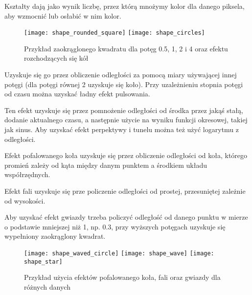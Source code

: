 
Kształty dają jako wynik liczbę, przez którą mnożymy kolor dla danego piksela, aby wzmocnić lub osłabić w nim kolor.\bigskip

\begin{wrapfigure}{l}{0.55\textwidth}
	\centering
	\noindent\texttt{[image: shape\_rounded\_square]}
	\noindent\texttt{[image: shape\_circles]}
	\caption{Przykład zaokrąglonego kwadratu dla potęg 0.5, 1, 2 i 4 oraz efektu rozchodzących się kół}
\end{wrapfigure}


Uzyskuje się go przez obliczenie odległo\'sci za pomocą miary używającej innej potęgi (dla potęgi równej 2 uzyskuje się koło). Przy uzależnieniu stopnia potęgi od czasu można uzyskać ładny efekt pulsowania.\smallskip


Ten efekt uzyskuje się przez pomnożenie odległo\'sci od \'srodka przez jaką\'s stałą, dodanie aktualnego czasu, a następnie użycie na wyniku funkcji okresowej, takiej jak sinus. Aby uzyskać efekt perpektywy i tunelu można też użyć logarytmu z odległo\'sci.\smallskip\\


Efekt pofalowanego koła uzyskuje się przez obliczenie odległo\'sci od koła, którego promień zależy od kąta między danym punktem a \'srodkiem układu współrzędnych.\smallskip


Efekt fali uzyskuje się prze policzenie odległo\'sci od prostej, przesuniętej zależnie od wysoko\'sci.\smallskip


Aby uzyskać efekt gwiazdy trzeba policzyć odległo\'sć od danego punktu w mierze o podstawie mniejszej niż 1, np. 0.3, przy wyższych potęgach uzyskuje się wypełniony zaokrąglony kwadrat.

\begin{figure}[h]
	\centering
	\noindent\texttt{[image: shape\_waved\_circle]}
	\noindent\texttt{[image: shape\_wave]}
	\noindent\texttt{[image: shape\_star]}
	\caption{Przykład użycia efektów pofalowanego koła, fali oraz gwiazdy dla różnych danych}
\end{figure}\newpage

